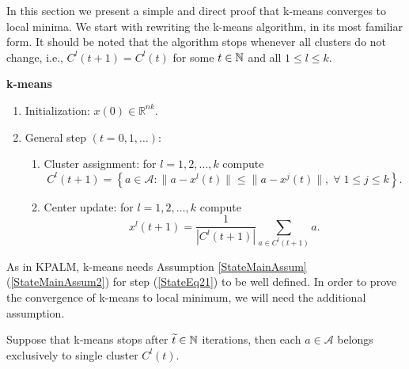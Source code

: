 In this section we present a simple and direct proof that k-means converges to local minima. We start with rewriting the k-means algorithm, in its most familiar form. It should be noted that the algorithm stops whenever all clusters do not change, i.e., $C^l(t+1)=C^l(t)$ for some $t \in \mathbb{N}$ and all $1 \leq l \leq k$.
\begin{framed}
\noindent \textbf{k-means}
\begin{enumerate}[(1)]
	\item Initialization: $x(0) \in \mathbb{R}^{nk}$.
	\item General step $\left( t=0,1, \ldots \right)$:
	\begin{enumerate}[(2.1)]
		\item Cluster assignment: for $l=1, 2, \ldots ,k$ compute
		\begin{equation}
			C^l(t+1) = \left\lbrace a \in \mathcal{A} : \| a - x^l(t) \| \leq \|a - x^j(t) \|, \; \forall \; 1 \leq j \leq k \right\rbrace. \label{StateEq20}
		\end{equation}
		\item Center update: for $l=1, 2, \ldots ,k$ compute
		\begin{equation}
			x^l(t+1) = \frac{1}{\left| C^l(t+1) \right|} \sum\limits_{a \in C^l(t+1)} a . \label{StateEq21}
		\end{equation}
	\end{enumerate}
\end{enumerate}
\end{framed}

As in KPALM, k-means needs Assumption \ref{StateMainAssum}(\ref{StateMainAssum2}) for step (\ref{StateEq21}) to be well defined. In order to prove the convergence of k-means to local minimum, we will need the additional assumption.

\begin{assumption} \label{StateEq23}
Suppose that k-means stops after $\widetilde{t} \in \mathbb{N}$ iterations, then each $a \in \mathcal{A}$ belongs exclusively to single cluster $C^l(t)$.
\end{assumption}

